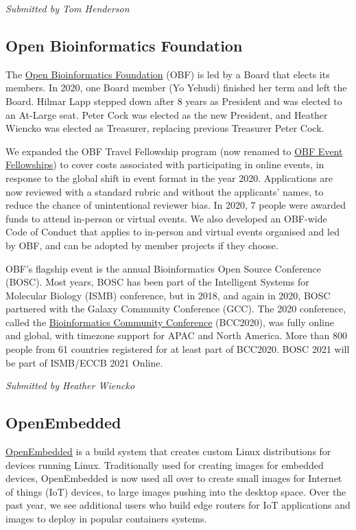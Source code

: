\documentclass[a4paper]{report}
\begin{document}
{\em Submitted by Tom Henderson}

\subsection{Open Bioinformatics Foundation}

The \href{https://www.open-bio.org/}{Open Bioinformatics Foundation} (OBF) is led by a Board that elects its members. In 2020, one Board member (Yo Yehudi) finished her term and left the Board. Hilmar Lapp stepped down after 8 years as President and was elected to an At-Large seat. Peter Cock was elected as the new President, and Heather Wiencko was elected as Treasurer, replacing previous Treasurer Peter Cock.

We expanded the OBF Travel Fellowship program (now renamed to \href{https://www.open-bio.org/event-awards/}{OBF Event Fellowships}) to cover costs associated with participating in online events, in response to the global shift in event format in the year 2020.  Applications are now reviewed with a standard rubric and without the applicants' names, to reduce the chance of unintentional reviewer bias. In 2020, 7 people were awarded funds to attend in-person or virtual events. We also developed an OBF-wide Code of Conduct that applies to in-person and virtual events organised and led by OBF, and can be adopted by member projects if they choose.

OBF's flagship event is the annual Bioinformatics Open Source Conference (BOSC). Most years, BOSC has been part of the Intelligent Systems for Molecular Biology (ISMB) conference, but in 2018, and again in 2020, BOSC partnered with the Galaxy Community Conference (GCC). The 2020 conference, called the \href{https://bcc2020.github.io/}{Bioinformatics Community Conference} (BCC2020), was fully online and global, with timezone support for APAC and North America. More than 800 people from 61 countries registered for at least part of BCC2020. BOSC 2021 will be part of ISMB/ECCB 2021 Online.

{\em Submitted by Heather Wiencko}

\subsection{OpenEmbedded}

\href{https://www.openembedded.org/}{OpenEmbedded} is a build system that creates custom Linux distributions for devices running Linux. Traditionally used for creating images for embedded devices, OpenEmbedded is now used all over to create small images for Internet of things (IoT) devices, to large images pushing into the desktop space.  Over the past year, we see additional users who build edge routers for IoT applications and images to deploy in popular containers systems.
\end{document}
